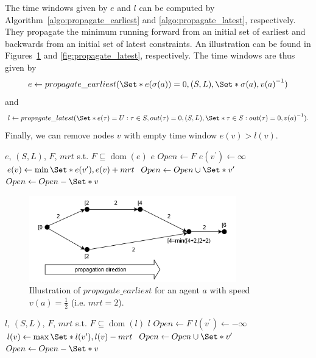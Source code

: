\documentclass{article}
\DeclareMathOperator{\dom}{dom}
\begin{document}
The time windows given by $e$ and $l$ can be computed by Algorithm~\ref{algo:propagate_earliest} and \ref{algo:propagate_latest}, respectively. They propagate the minimum running forward from an initial set of earliest and backwards from an initial set of latest constraints. An illustration can be found in Figures~\ref{fig:propagate_earliest} and \ref{fig:propagate_latest}, respectively.
The time windows are thus given by
$$e\leftarrow propagate\_earliest(\Set*{e(\sigma(a))=0}, (S,L), \Set*{\sigma(a)}, {v(a)}^{-1})$$ and $$l\leftarrow propagate\_latest(\Set*{e(\tau)=U: \tau \in S, out(\tau)=0}, (S,L), \Set*{\tau \in S: out(\tau)=0},{v(a)}^{-1}).$$ 
Finally, we can remove nodes $v$ with empty time window $e(v)>l(v)$.





\begin{algorithm}
	\caption{$propagate\_earliest$} \label{algo:propagate_earliest}
	\begin{algorithmic}[1]
	    \Require $e$, $(S,L)$, $F$, $mrt$ s.t. $F\subseteq \dom(e)$
	    \Ensure $e$
	    \State $Open \leftarrow F$
    	        \If{$v^\prime \not\in \dom(e)$}
    	            \State $e(v^\prime) \leftarrow \infty$
    	        \EndIf
    			\State $e(v) \leftarrow \min \Set*{e(v^\prime), e(v)+mrt}$
    			\State $Open \leftarrow Open \cup \Set*{v^\prime}$
    		\EndFor
			\State $Open \leftarrow Open - \Set*{v}$
		\EndFor
	\end{algorithmic} 
\end{algorithm}

\begin{figure}[hbtp]
	\centering
  \includegraphics[width=0.8\textwidth]{H1_propagate_earliest.png}
	\caption{Illustration of $propagate\_earliest$ for an agent $a$ with speed $v(a)=\frac{1}{2}$ (i.e. $mrt=2$).}
	\label{fig:propagate_earliest}
\end{figure}


\begin{algorithm}
	\caption{$propagate\_latest$} \label{algo:propagate_latest}
	\begin{algorithmic}[1]
	    \Require $l$, $(S,L)$, $F$, $mrt$  s.t. $F\subseteq \dom(l)$
	    \Ensure $l$
	    \State $Open \leftarrow F$
    	        \If{$v^\prime \not\in \dom(l)$}
    	            \State $l(v^\prime) \leftarrow -\infty$
    	        \EndIf
    			\State $l(v) \leftarrow \max \Set*{l(v^\prime), l(v)-mrt}$
    			\State $Open \leftarrow Open \cup \Set*{v^\prime}$
    		\EndFor
			\State $Open \leftarrow Open - \Set*{v}$
		\EndFor
	\end{algorithmic} 
\end{algorithm}
\end{document}
